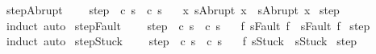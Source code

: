\begin{isabellebody}
\endisatagproof
{\isafoldproof}%
%
\isadelimproof
\isanewline
%
\endisadelimproof
\isanewline
{}\isamarkupfalse%
\ step{\isacharunderscore}Abrupt{\isacharcolon}\ \isanewline
\ \ \ step{\isacharcolon}\ {\isachardoublequoteopen}{\isasymGamma}{\isasymturnstile}\ {\isacharparenleft}c{\isacharcomma}\ s{\isacharparenright}\ {\isasymrightarrow}\ {\isacharparenleft}c{\isacharprime}{\isacharcomma}\ s{\isacharprime}{\isacharparenright}{\isachardoublequoteclose}\isanewline
\ \ \ {\isachardoublequoteopen}{\isasymAnd}x{\isachardot}\ s{\isacharequal}Abrupt\ x\ {\isasymLongrightarrow}\ s{\isacharprime}{\isacharequal}Abrupt\ x{\isachardoublequoteclose}\isanewline
%
\isadelimproof
%
\endisadelimproof
%
\isatagproof
{}\isamarkupfalse%
\ step\isanewline
{}\isamarkupfalse%
\ {\isacharparenleft}induct{\isacharparenright}\ auto%
\endisatagproof
{\isafoldproof}%
%
\isadelimproof
\isanewline
%
\endisadelimproof
\isanewline
{}\isamarkupfalse%
\ step{\isacharunderscore}Fault{\isacharcolon}\ \isanewline
\ \ \ step{\isacharcolon}\ {\isachardoublequoteopen}{\isasymGamma}{\isasymturnstile}\ {\isacharparenleft}c{\isacharcomma}\ s{\isacharparenright}\ {\isasymrightarrow}\ {\isacharparenleft}c{\isacharprime}{\isacharcomma}\ s{\isacharprime}{\isacharparenright}{\isachardoublequoteclose}\isanewline
\ \ \ {\isachardoublequoteopen}{\isasymAnd}f{\isachardot}\ s{\isacharequal}Fault\ f\ {\isasymLongrightarrow}\ s{\isacharprime}{\isacharequal}Fault\ f{\isachardoublequoteclose}\isanewline
%
\isadelimproof
%
\endisadelimproof
%
\isatagproof
{}\isamarkupfalse%
\ step\isanewline
{}\isamarkupfalse%
\ {\isacharparenleft}induct{\isacharparenright}\ auto%
\endisatagproof
{\isafoldproof}%
%
\isadelimproof
\isanewline
%
\endisadelimproof
\isanewline
{}\isamarkupfalse%
\ step{\isacharunderscore}Stuck{\isacharcolon}\ \isanewline
\ \ \ step{\isacharcolon}\ {\isachardoublequoteopen}{\isasymGamma}{\isasymturnstile}\ {\isacharparenleft}c{\isacharcomma}\ s{\isacharparenright}\ {\isasymrightarrow}\ {\isacharparenleft}c{\isacharprime}{\isacharcomma}\ s{\isacharprime}{\isacharparenright}{\isachardoublequoteclose}\isanewline
\ \ \ {\isachardoublequoteopen}{\isasymAnd}f{\isachardot}\ s{\isacharequal}Stuck\ {\isasymLongrightarrow}\ s{\isacharprime}{\isacharequal}Stuck{\isachardoublequoteclose}\isanewline
%
\isadelimproof
%
\endisadelimproof
%
\isatagproof
{}\isamarkupfalse%
\ step\isanewline

\end{isabellebody}

